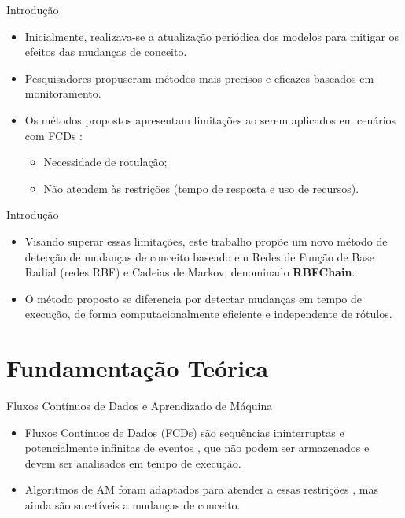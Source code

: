\documentclass[10pt]{beamer}
\begin{document}
\begin{frame}{Introdução}
    \begin{itemize}
        \item<1 -> Inicialmente, realizava-se a atualização periódica dos modelos para mitigar os efeitos das mudanças de conceito.
        \item<1 -> Pesquisadores propuseram métodos mais precisos e eficazes baseados em monitoramento.
        \item<1 -> Os métodos propostos apresentam limitações ao serem aplicados em cenários com FCDs \cite{Aggarwal:2006:DSM:1196418}:
        \begin{itemize}
            \item<1 -> Necessidade de rotulação;
            \item<1 -> Não atendem às restrições (tempo de resposta e uso de recursos).
        \end{itemize}
      \end{itemize}
\end{frame}

\begin{frame}{Introdução}
    \begin{itemize}
        \item<1 -> Visando superar essas limitações, este trabalho propõe um novo método de detecção de mudanças de conceito baseado em \alert{Redes de Função de Base Radial (redes RBF) e Cadeias de Markov}, denominado \textbf{\alert{RBFChain}}.
        \item<1 -> O método proposto se diferencia por detectar mudanças em \alert{tempo de execução}, de forma computacionalmente \alert{eficiente} e \alert{independente de rótulos}.
    \end{itemize}
\end{frame}

\section{Fundamentação Teórica}

\begin{frame}{Fluxos Contínuos de Dados e Aprendizado de Máquina}
    \begin{itemize}
        \item<1 -> \alert{Fluxos Contínuos de Dados (FCDs)} são sequências ininterruptas e potencialmente infinitas de eventos \cite{Aggarwal:2006:DSM:1196418}, que não podem ser armazenados e devem ser analisados em tempo de execução.
        \item<1 -> Algoritmos de AM foram adaptados para atender a essas restrições \cite{Aggarwal:2003:FCE:1315451.1315460}, mas ainda são sucetíveis a \alert{mudanças de conceito}.
      \end{itemize}
\end{frame}
\end{document}
